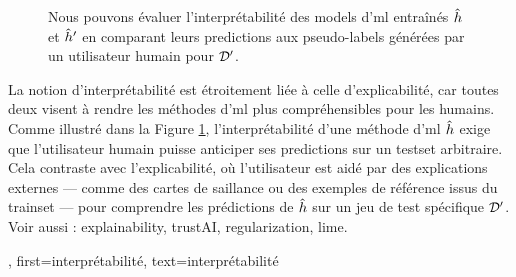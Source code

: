 {{\begin{figure}
\begin{center}
				\caption{Nous pouvons évaluer l’interprétabilité des \glspl{model} d'\gls{ml} entraînés 
					$\hat{h}$ et $\hat{h}'$ en comparant leurs \glspl{prediction} aux pseudo-\glspl{label} générées par un utilisateur humain pour $\mathcal{D}'$. 
					\label{fig_aug_simulatability_dict}}
			\end{center}
		\end{figure}
		La notion d’interprétabilité est étroitement liée à celle d’explicabilité,  
		car toutes deux visent à rendre les méthodes d'\gls{ml} plus compréhensibles pour les humains.  
		Comme illustré dans la Figure \ref{fig_aug_simulatability_dict}, l’interprétabilité d’une méthode d'\gls{ml}  
		$\hat{h}$ exige que l’utilisateur humain puisse anticiper ses \glspl{prediction}  
		sur un \gls{testset} arbitraire. Cela contraste avec l’explicabilité, où l’utilisateur est aidé par  
		des explications externes — comme des cartes de saillance ou des exemples de référence issus du \gls{trainset} —  
		pour comprendre les prédictions de $\hat{h}$ sur un jeu de test spécifique $\mathcal{D}'$. \\
		Voir aussi : \gls{explainability}, \gls{trustAI}, \gls{regularization}, \gls{lime}.},
	first={interprétabilité},
	text={interprétabilité}
}

